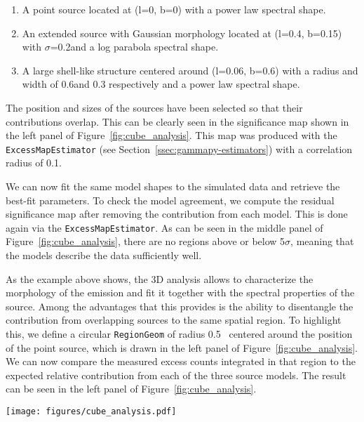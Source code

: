 \documentclass[traditabstract, longauth]{aa}
\newcommand{\code}[1]{\texttt{#1}}
\begin{document}
\begin{enumerate}
    \item A point source located at (l=0\textdegree, b=0\textdegree) with a power law
	      spectral shape.
    \item An extended source with Gaussian morphology located at (l=0.4\textdegree,
	      b=0.15\textdegree) with $\sigma$=0.2\textdegree and a log parabola spectral
	      shape.
    \item A large shell-like structure centered around (l=0.06\textdegree,
	      b=0.6\textdegree) with a radius and width of 0.6\textdegree and 0.3\textdegree
	      respectively and a power law spectral shape.
\end{enumerate}

The position and sizes of the sources
have been selected so that their contributions overlap. This can be clearly
seen in the significance map shown in the left panel of
Figure~\ref{fig:cube_analysis}. This map was produced with the
\code{ExcessMapEstimator} (see Section~\ref{ssec:gammapy-estimators}) with a
correlation radius of 0.1\textdegree.

We can now fit the same model shapes to the simulated data and retrieve the
best-fit parameters. To check the model agreement, we compute the residual
significance map after removing the contribution from each model. This is done
again via the \code{ExcessMapEstimator}. As can be seen in the middle panel of
Figure~\ref{fig:cube_analysis}, there are no regions above or below 5$\sigma$,
meaning that the models describe the data sufficiently well.

As the example above shows, the 3D analysis allows to characterize the
morphology of the emission and fit it together with the spectral properties of
the source.  Among the advantages that this provides is the ability to
disentangle the contribution from overlapping sources to the same spatial
region. To highlight this, we define a circular \code{RegionGeom} of radius
0.5\textdegree~ centered around the position of the point source, which is drawn
in the left panel of Figure~\ref{fig:cube_analysis}. We can now compare the
measured excess counts integrated in that region to the expected relative
contribution from each of the three source models. The result can be seen in the left
panel of Figure~\ref{fig:cube_analysis}.

\begin{figure*}[t]
	\centering
	\texttt{[image: figures/cube\_analysis.pdf]}
	\caption{Example of a 3D analysis for simulated sources with point-like, Gaussian
		and shell-like morphology. The simulation uses \textit{prod5} \irfs from \cta.
		The left image shows a significance map where the three simulated sources can be
		seen. The middle figure shows another significance map, but this time after
		subtracting the best-fit model for each of the sources, which are displayed in
		black. The right figure shows the contribution of each source model to the
		circular region of radius 0.5\textdegree drawn in the left image, together with
		the excess counts inside that region. } \label{fig:cube_analysis}
\end{figure*}
\end{document}
